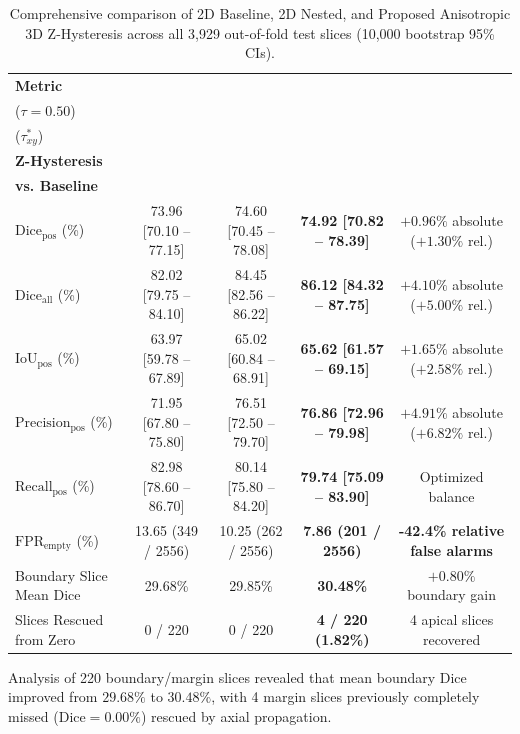 \documentclass[preprint,3p,times,onecolumn]{elsarticle}
\begin{document}
\begin{table}[tbp]
\centering
\caption{Comprehensive comparison of 2D Baseline, 2D Nested, and Proposed Anisotropic 3D Z-Hysteresis across all 3,929 out-of-fold test slices (10,000 bootstrap 95\% CIs).}
\label{tab:method_comparison}
\setlength{\tabcolsep}{3.5pt}
\renewcommand{\arraystretch}{0.96}
\footnotesize
\begin{tabular*}{\textwidth}{@{\extracolsep{\fill}}lcccc}
\toprule
\textbf{Metric} & \shortstack{\textbf{2D Baseline} \\ ($\tau=0.50$)} & \shortstack{\textbf{2D Nested} \\ ($\tau_{xy}^*$)} & \shortstack{\textbf{Proposed 3D} \\ \textbf{Z-Hysteresis}} & \shortstack{\textbf{Relative Change} \\ \textbf{vs. Baseline}} \\
\midrule
$\text{Dice}_{\text{pos}}$ (\%) & 73.96 [70.10 -- 77.15] & 74.60 [70.45 -- 78.08] & \textbf{74.92 [70.82 -- 78.39]} & $+0.96\%$ absolute ($+1.30\%$ rel.) \\
$\text{Dice}_{\text{all}}$ (\%) & 82.02 [79.75 -- 84.10] & 84.45 [82.56 -- 86.22] & \textbf{86.12 [84.32 -- 87.75]} & $+4.10\%$ absolute ($+5.00\%$ rel.) \\
$\text{IoU}_{\text{pos}}$ (\%) & 63.97 [59.78 -- 67.89] & 65.02 [60.84 -- 68.91] & \textbf{65.62 [61.57 -- 69.15]} & $+1.65\%$ absolute ($+2.58\%$ rel.) \\
$\text{Precision}_{\text{pos}}$ (\%) & 71.95 [67.80 -- 75.80] & 76.51 [72.50 -- 79.70] & \textbf{76.86 [72.96 -- 79.98]} & $+4.91\%$ absolute ($+6.82\%$ rel.) \\
$\text{Recall}_{\text{pos}}$ (\%) & 82.98 [78.60 -- 86.70] & 80.14 [75.80 -- 84.20] & \textbf{79.74 [75.09 -- 83.90]} & Optimized balance \\
$\text{FPR}_{\text{empty}}$ (\%) & 13.65 (349 / 2556) & 10.25 (262 / 2556) & \textbf{7.86 (201 / 2556)} & \textbf{-42.4\% relative false alarms} \\
\midrule
Boundary Slice Mean Dice & 29.68\% & 29.85\% & \textbf{30.48\%} & $+0.80\%$ boundary gain \\
Slices Rescued from Zero & 0 / 220 & 0 / 220 & \textbf{4 / 220 (1.82\%)} & 4 apical slices recovered \\
\bottomrule
\end{tabular*}
\end{table}

Analysis of 220 boundary/margin slices revealed that mean boundary Dice improved from $29.68\%$ to $30.48\%$, with 4 margin slices previously completely missed ($\text{Dice} = 0.00\%$) rescued by axial propagation.
\end{document}
